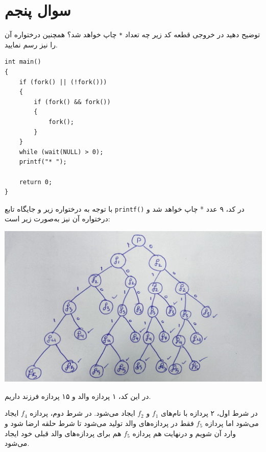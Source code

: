 \section{سوال پنجم}

توضیح دهید در خروجی قطعه کد زیر چه تعداد \texttt{*} چاپ خواهد شد؟ همچنین درختواره آن را نیز رسم نمایید.


\begin{latin}
\begin{lstlisting}[caption=Code of Q3, label=cpp_code_example]
int main() 
{
	if (fork() || (!fork())) 
	{
		if (fork() && fork()) 
		{
			fork();
		}
	}
	while (wait(NULL) > 0);
	printf("* ");
	
	return 0;
}
\end{lstlisting}
\end{latin}


\begin{qsolve}
با توجه به درختواره زیر و جایگاه تابع \texttt{printf()} در کد، ۹ عدد * چاپ خواهد شد و درختواره آن نیز به‌صورت زیر است:


\begin{center}
	\includegraphics*[width=1\linewidth]{pics/img7.jpg}
\end{center}

\end{qsolve}


\begin{qsolve}
	در این کد، ۱ پردازه والد و ۱۵ پردازه فرزند داریم.
	
	در شرط اول، ۲ پردازه با نام‌های $f_1 $ و $f_2 $ ایجاد می‌شود. در شرط دوم، پردازه $f_4 $ ایجاد می‌شود اما پردازه $f_5 $ فقط در پردازه‌های والد تولید می‌شود تا شرط حلقه ارضا شود و وارد آن شویم و درنهایت هم پردازه  $f_5 $ هم برای پردازه‌های والد قبلی خود ایجاد می‌شود.
\end{qsolve}